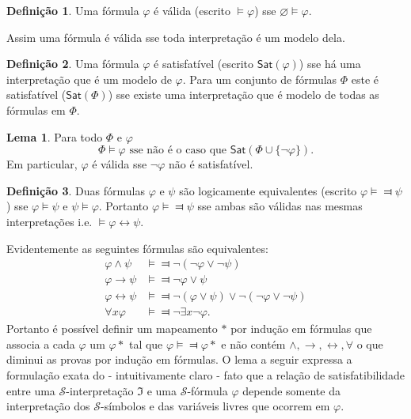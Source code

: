 \documentclass[11pt]{article}
\theoremstyle{definition}
\newtheorem{defn}{Definição}
\newtheorem{lemma}{Lema}
\newcommand{\sse}{\leftrightarrow}
\newcommand{\mc}[1]{\mathcal{#1}}
\newcommand{\mf}[1]{\mathfrak{#1}}
\newcommand{\msf}[1]{\mathsf{#1}}
\begin{document}
\begin{shaded}
\begin{defn}
Uma fórmula $\varphi$ é válida (escrito $\vDash\varphi$) sse $\varnothing\vDash\varphi$.
\end{defn}
\end{shaded}

Assim uma fórmula é válida sse toda interpretação é um modelo dela.

\begin{shaded}
\begin{defn}
Uma fórmula $\varphi$ é satisfatível (escrito $\msf{Sat}(\varphi)$) sse há uma interpretação que é um modelo de $\varphi$. Para um conjunto de fórmulas $\Phi$ este é satisfatível ($\msf{Sat}(\Phi)$) sse existe uma interpretação que é modelo de todas as fórmulas em $\Phi$.
\end{defn}
\end{shaded}

\begin{lemma}
Para todo $\Phi$ e $\varphi$
\[
\Phi\vDash\varphi\text{ sse não é o caso que }\msf{Sat}(\Phi\cup\{\neg\varphi\}).
\]
Em particular, $\varphi$ é válida sse $\neg\varphi$ não é satisfatível.
\end{lemma}

\begin{shaded}
\begin{defn}
Duas fórmulas $\varphi$ e $\psi$ são logicamente equivalentes (escrito $\varphi\vDash\Dashv\psi$) sse $\varphi\vDash\psi$ e $\psi\vDash\varphi$. Portanto $\varphi\vDash\Dashv\psi$ sse ambas são válidas nas mesmas interpretações i.e. $\vDash\varphi\sse\psi$.
\end{defn}
\end{shaded}

Evidentemente as seguintes fórmulas são equivalentes:
\begin{align*}
    \varphi\wedge\psi &\vDash\Dashv \neg(\neg\varphi\vee\neg\psi)\\
    \varphi\to\psi &\vDash\Dashv \neg\varphi\vee\psi\\
    \varphi\sse\psi &\vDash\Dashv \neg(\varphi\vee\psi)\vee\neg(\neg\varphi\vee\neg\psi)\\
    \forall x\varphi &\vDash\Dashv \neg\exists x\neg\varphi.
\end{align*}
Portanto é possível definir um mapeamento $*$ por indução em fórmulas que associa a cada $\varphi$ um $\varphi*$ tal que $\varphi\vDash\Dashv\varphi*$ e não contém $\wedge,\to,\sse,\forall$ o que diminui as provas por indução em fórmulas.
O lema a seguir expressa a formulação exata do - intuitivamente claro - fato que a relação de satisfatibilidade entre uma $\mc{S}$-interpretação $\mf{I}$ e uma $\mc{S}$-fórmula $\varphi$ depende somente da interpretação dos $\mc{S}$-símbolos e das variáveis livres que ocorrem em $\varphi$.
\end{document}
